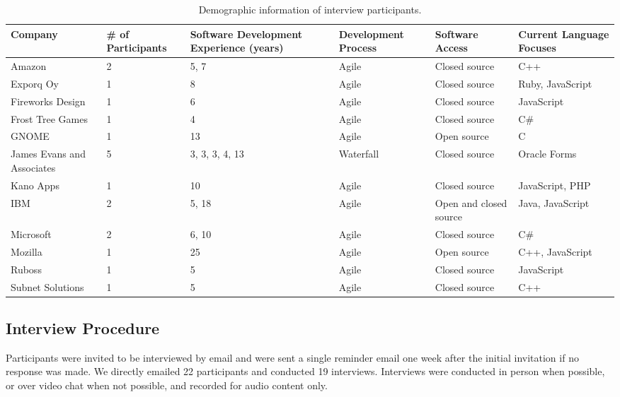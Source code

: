 \documentclass[conference]{IEEEtran}
\begin{document}
\begin{table*}[tb!]
\begin{center}
\begin{tabular}{| l | p{2cm} | p{2cm} | p{2cm} | p{2cm} | p{2cm} |}
\hline
Company & \# of Participants & Software Development Experience (years) & Development Process & Software Access & Current Language Focuses \\
\hline
\hline
Amazon & 2 & 5, 7 & Agile & Closed source & C++ \\ \hline
Exporq Oy & 1 & 8 & Agile & Closed source & Ruby, JavaScript \\ \hline
Fireworks Design & 1 & 6 & Agile & Closed source & JavaScript \\ \hline
Frost Tree Games & 1 & 4 & Agile & Closed source & C\# \\ \hline
GNOME & 1 & 13 & Agile & Open source & C \\ \hline
James Evans and Associates & 5 & 3, 3, 3, 4, 13 & Waterfall & Closed source & Oracle Forms \\ \hline
Kano Apps & 1 & 10 & Agile & Closed source & JavaScript, PHP \\ \hline
IBM & 2 & 5, 18 & Agile & Open and closed source & Java, JavaScript \\ \hline
Microsoft & 2 & 6, 10 & Agile & Closed source & C\# \\ \hline
Mozilla & 1 & 25 & Agile & Open source & C++, JavaScript \\ \hline
Ruboss & 1 & 5 & Agile & Closed source & JavaScript \\ \hline
Subnet Solutions & 1 & 5 & Agile & Closed source & C++ \\ \hline

\end{tabular}
\end{center}
\caption{Demographic information of interview participants.\label{tab:demo}}
\end{table*}

\subsection{Interview Procedure}

Participants were invited to be interviewed by email and were sent a single reminder email one week
after the initial invitation if no response was made. We directly emailed 22 participants and  conducted
19 interviews. Interviews were conducted in person when possible, or over video chat when not possible, and recorded for audio content only.
\end{document}
